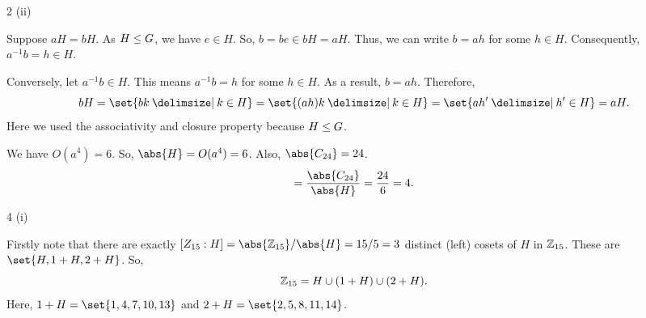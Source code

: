 \documentclass[11pt]{penrose}
\begin{document}
\begin{problem}{2 (ii)}

    Suppose $aH = bH$. As $H \mathrel{\leq} G$, we have $e \in H$. So, $b = be \in bH = aH$. Thus, we can write $b = ah$ for some $h \in H$. Consequently, $a^{-1} b = h \in H$.

    Conversely, let $a^{-1} b \in H$. This means $a^{-1} b = h$ for some $h \in H$. As a result, $b = ah$. Therefore,
    \begin{equation*}
        bH = \set{bk \st k \in H} = \set{(ah)k \st k \in H} = \set{ah' \st h' \in H} = aH.
    \end{equation*}
    Here we used the associativity and closure property because $H \mathrel{\leq} G$.
\end{problem}

\begin{problem}{3}

    We have $O(a^4) = 6$. So, $\abs{H} = O(a^4) = 6$. Also, $\abs{C_{24}} = 24$.
    \begin{equation*}
        [C_{24} : H] = \frac{\abs{C_{24}}}{\abs{H}} = \frac{24}{6} = 4.
    \end{equation*}
\end{problem}

\clearpage

\begin{problem}{4 (i)}

    Firstly note that there are exactly $[Z_{15} : H] = \abs{\Z_{15}}/\abs{H} = 15/5 = 3$ distinct (left) cosets of $H$ in $\mathbb{Z}_{15}$. These are $\set{H, 1+H, 2+H}$. So,
    \begin{equation*}
        \mathbb{Z}_{15} = H \cup (1+H) \cup (2+H).
    \end{equation*}
    Here, $1+H = \set{1,4,7,10,13}$ and $2+H = \set{2,5,8,11,14}$.
\end{problem}
\end{document}
